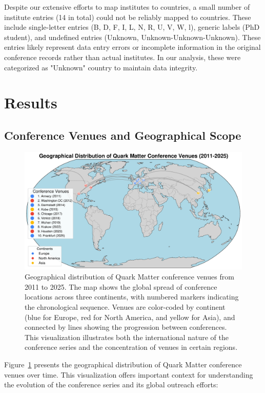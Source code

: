 \documentclass[a4paper,11pt]{article}
\begin{document}
Despite our extensive efforts to map institutes to countries, a small number of institute entries (14 in total) could not be reliably mapped to countries. These include single-letter entries (B, D, F, I, L, N, R, U, V, W, l), generic labels (PhD student), and undefined entries (Unknown, Unknown-Unknown-Unknown). These entries likely represent data entry errors or incomplete information in the original conference records rather than actual institutes. In our analysis, these were categorized as "Unknown" country to maintain data integrity.

\section{Results}

\subsection{Conference Venues and Geographical Scope}

\begin{figure}[H]
\centering
\includegraphics[width=\textwidth]{figures/conference_venues.pdf}
\caption{Geographical distribution of Quark Matter conference venues from 2011 to 2025. The map shows the global spread of conference locations across three continents, with numbered markers indicating the chronological sequence. Venues are color-coded by continent (blue for Europe, red for North America, and yellow for Asia), and connected by lines showing the progression between conferences. This visualization illustrates both the international nature of the conference series and the concentration of venues in certain regions.}
\label{fig:venues}
\end{figure}

Figure~\ref{fig:venues} presents the geographical distribution of Quark Matter conference venues over time. This visualization offers important context for understanding the evolution of the conference series and its global outreach efforts:
\end{document}
